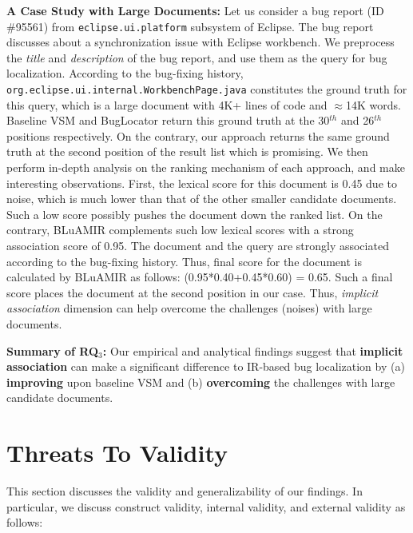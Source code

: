 \documentclass[sigconf,review,anonymous]{acmart}
\begin{document}
\textbf{A Case Study with Large Documents:} Let us consider a bug report (ID \#95561) from \texttt{eclipse.ui.platform} subsystem of Eclipse. The bug report discusses about a synchronization issue with Eclipse workbench. We preprocess the \emph{title} and \emph{description} of the bug report, and use them as the query for bug localization. According to the bug-fixing history, \texttt{org.eclipse.ui.internal.WorkbenchPage.java} constitutes the ground truth for this query, which is a large document with 4K+ lines of code and $\approx$14K words. Baseline VSM \cite{vector-space-model} and BugLocator \cite{Jian} return this ground truth at the 30$^{th}$ and 26$^{th}$ positions respectively. On the contrary, our approach returns the same ground truth at the second position of the result list which is promising. We then perform in-depth analysis on the ranking mechanism of each approach, and make interesting observations. First, the lexical score for this document is 0.45 due to noise, which is much lower than that of the other smaller candidate documents. Such a low score possibly pushes the document down the ranked list. On the contrary, BLuAMIR complements such low lexical scores with a strong association score of 0.95. The document and the query are strongly associated according to the bug-fixing history. Thus, final score for the document is calculated by BLuAMIR as follows:  (0.95*0.40+0.45*0.60) = 0.65. Such a final score places the document at the second position in our case. Thus, \emph{implicit association} dimension can help overcome the challenges (noises) with large documents. 

\begin{framed}
	\noindent
	\textbf{Summary of RQ$_3$:} Our empirical and analytical findings suggest that \textbf{implicit association} can make a significant difference to IR-based bug localization by (a) \textbf{improving} upon baseline VSM and (b) \textbf{overcoming} the challenges with large candidate documents.    
\end{framed}

\section{Threats To Validity}\label{sec:threats}
This section discusses the validity and generalizability of our findings. In particular, we discuss construct validity, internal validity, and external validity as follows:
\end{document}
